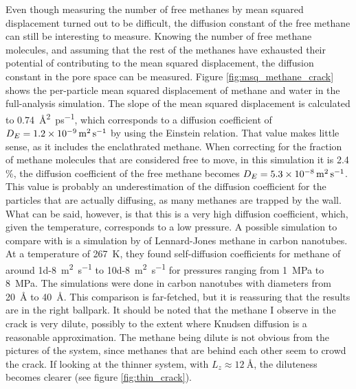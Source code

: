 Even though measuring the number of free methanes by mean squared displacement turned out to be difficult, the diffusion constant of the free methane can still be interesting to measure. Knowing the number of free methane molecules, and assuming that the rest of the methanes have exhausted their potential of contributing to the mean squared displacement, the diffusion constant in the pore space can be measured. Figure \ref{fig:msq_methane_crack} shows the per-particle mean squared displacement of methane and water in the full-analysis simulation. The slope of the mean squared displacement is calculated to \SI{0.74}{\angstrom\squared\per\pico\second}, which corresponds to a diffusion coefficient of $D_E = \SI{1.2d-9}{\meter\squared\per\second}$ by using the Einstein relation. That value makes little sense, as it includes the enclathrated methane. When correcting for the fraction of methane molecules that are considered free to move, in this simulation it is 2.4 \%, the diffusion coefficient of the free methane becomes $D_E = \SI{5.3d-8}{\meter\squared\per\second}$. This value is probably an underestimation of the diffusion coefficient for the particles that are actually diffusing, as many methanes are trapped by the wall. What can be said, however, is that this is a very high diffusion coefficient, which, given the temperature, corresponds to a low pressure. A possible simulation to compare with is a simulation by \citet{Cao2004} of Lennard-Jones methane in carbon nanotubes. At a temperature of \SI{267}{\kelvin}, they found self-diffusion coefficients for methane of around \SI{1d-8}{\meter\squared\per\second} to \SI{10d-8}{\meter\squared\per\second} for pressures ranging from \SI{1}{\mega\pascal} to \SI{8}{\mega\pascal}. The simulations were done in carbon nanotubes with diameters from \SI{20}{\angstrom} to \SI{40}{\angstrom}. This comparison is far-fetched, but it is reassuring that the results are in the right ballpark. It should be noted that the methane I observe in the crack is very dilute, possibly to the extent where Knudsen diffusion is a reasonable approximation. The methane being dilute is not obvious from the pictures of the system, since methanes that are behind each other seem to crowd the crack. If looking at the thinner system, with $L_z \approx \SI{12}{\angstrom}$, the diluteness becomes clearer (see figure \ref{fig:thin_crack}).

